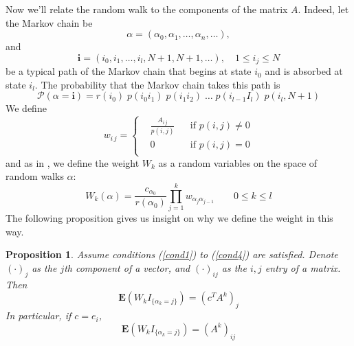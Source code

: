 \documentclass{elsart}
\newtheorem{proposition}[theorem]{Proposition}
\theoremstyle{remark}
\theoremstyle{definition}
\theoremstyle{proof}
\begin{document}
        Now we'll relate the random walk to the components of the matrix $A$.
        Indeed, let the Markov chain be
        \[ \alpha =
            \left( \alpha_0, \alpha_1, \ldots, \alpha_n, \ldots \right),
        \]
        and
        \[ \mathbf{i} =
            \left( i_0, i_1, \ldots , i_l, N+1, N+1, \ldots \right),
            \quad 1\le i_j\le N
        \]
        be a typical path of the Markov chain that begins at state $i_0$ and
        is absorbed at state $i_l$.  The probability that the Markov chain
        takes this path is
        \[ \mathcal{P}(\alpha=\mathbf{i}) =
            r(i_0) \; p(i_0 i_1) \; p(i_1 i_2) \; \ldots \;
            p(i_{l-1} I_l) \; p(i_l,N+1)
        \]
        We define
        \[ w_{i\,j} = \left\{ \begin{aligned}
                & \frac{A_{i\,j}}{p(i,j)} && \mbox{if } p(i,j) \ne 0 \\
                & 0                       && \mbox{if } p(i,j)  =  0 \\
            \end{aligned} \right.
        \]
        and as in \cite{Okten2005}, we define the weight $W_k$ as a random
        variables on the space of random walks $\alpha$:
        \begin{equation} \label{W}
            W_k(\alpha) =
            \frac{c_{\alpha_0}}{r(\alpha_0)}
            \prod_{j=1}^k w_{\alpha_j \alpha_{j-1}} \qquad 0 \le k \le l
        \end{equation}
        The following proposition gives us insight on why we define the weight
        in this way.
        \begin{proposition} \label{prop}
            Assume conditions (\ref{cond1}) to (\ref{cond4}) are satisfied.
            Denote $(\cdot)_j$ as the $j$th component of a vector, and
            $(\cdot)_{i j}$ as the $i,j$ entry of a matrix.  Then
            \begin{equation} \label{approx}
                \mathbf{E}( W_k I_{\{\alpha_k = j\}} ) = \left(c^T A^k\right)_j
            \end{equation}
            In particular, if $c = e_i$,
            \begin{equation} \label{matapprox}
                \mathbf{E}( W_k I_{\{\alpha_k = j\}} ) = \left(A^k\right)_{i j}
            \end{equation}
        \end{proposition}
\end{document}
